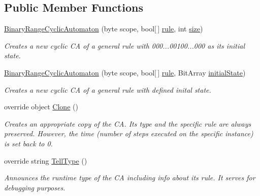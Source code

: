 \subsection*{Public Member Functions}
\begin{DoxyCompactItemize}
\item 
\hyperlink{class_cellular_1_1_binary_range_cyclic_automaton_a9f47b4027eba7db4a959946967ba371e}{Binary\+Range\+Cyclic\+Automaton} (byte scope, bool\mbox{[}$\,$\mbox{]} \hyperlink{class_cellular_1_1_binary_range_automaton_a4dda99c3151599c8ef12d08d7472144c}{rule}, int \hyperlink{class_cellular_1_1_automaton1_d_a915129ccf0f1e7092844c99ce6a28e5b}{size})
\begin{DoxyCompactList}\small\item\em Creates a new cyclic C\+A of a general rule with 000...00100...000 as its initial state. \end{DoxyCompactList}\item 
\hyperlink{class_cellular_1_1_binary_range_cyclic_automaton_a541a8c6eff23ec8afddc7388158df80e}{Binary\+Range\+Cyclic\+Automaton} (byte scope, bool\mbox{[}$\,$\mbox{]} \hyperlink{class_cellular_1_1_binary_range_automaton_a4dda99c3151599c8ef12d08d7472144c}{rule}, Bit\+Array \hyperlink{all__1_8js_ae8b87ff4be2ae1dd5267342795263360}{initial\+State})
\begin{DoxyCompactList}\small\item\em Creates a new cyclic C\+A of a general rule with defined inital state. \end{DoxyCompactList}\item 
override object \hyperlink{class_cellular_1_1_binary_range_cyclic_automaton_a2361fe82802e372b24b8bec6a6135278}{Clone} ()
\begin{DoxyCompactList}\small\item\em Creates an appropriate copy of the C\+A. Its type and the specific rule are always preserved. However, the time (number of steps executed on the specific instance) is set back to 0. \end{DoxyCompactList}\item 
override string \hyperlink{class_cellular_1_1_binary_range_cyclic_automaton_a75754d1c54550e1f29a9282647947cb8}{Tell\+Type} ()
\begin{DoxyCompactList}\small\item\em Announces the runtime type of the C\+A including info about its rule. It serves for debugging purposes. \end{DoxyCompactList}\end{DoxyCompactItemize}
